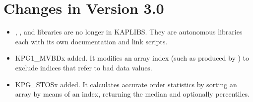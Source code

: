 \section{Changes in Version 3.0}
\begin{itemize}
\item {}, , and 
      libraries are no longer in KAPLIBS.  They are autonomous
      libraries each with its own documentation and link scripts.
\item KPG1\_MVBDx added. It modifies an array index (such as produced by
      ) to exclude indices that refer
      to bad data values.
\item KPG\_STOSx added.  It calculates accurate order statistics by
      sorting an array by means of an index, returning the median and
      optionally percentiles.
\end{itemize}

